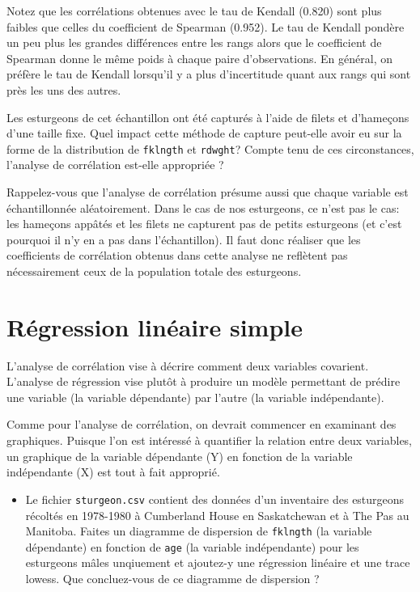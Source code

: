 \documentclass[12pt,]{book}
\providecommand{\tightlist}{%
  \setlength{\itemsep}{0pt}\setlength{\parskip}{0pt}}
\begin{document}
Notez que les corrélations obtenues avec le tau de Kendall (0.820) sont plus faibles que celles du coefficient de Spearman (0.952).
Le tau de Kendall pondère un peu plus les grandes différences entre les rangs alors que le coefficient de Spearman donne le même poids à chaque paire d'observations.
En général, on préfère le tau de Kendall lorsqu'il y a plus d'incertitude quant aux rangs qui sont près les uns des autres.

Les esturgeons de cet échantillon ont été capturés à l'aide de filets et d'hameçons d'une taille fixe.
Quel impact cette méthode de capture peut-elle avoir eu sur la forme de la distribution de \texttt{fklngth} et \texttt{rdwght}?
Compte tenu de ces circonstances, l'analyse de corrélation est-elle appropriée ?

Rappelez-vous que l'analyse de corrélation présume aussi que chaque variable est échantillonnée aléatoirement.
Dans le cas de nos esturgeons, ce n'est pas le cas: les hameçons appâtés et les filets ne capturent pas de petits esturgeons (et c'est pourquoi il n'y en a pas dans l'échantillon).
Il faut donc réaliser que les coefficients de corrélation obtenus dans cette analyse ne reflètent pas nécessairement ceux de la population totale des esturgeons.

\hypertarget{ruxe9gression-linuxe9aire-simple}{%
\section{Régression linéaire simple}\label{ruxe9gression-linuxe9aire-simple}}

L'analyse de corrélation vise à décrire comment deux variables covarient.
L'analyse de régression vise plutôt à produire un modèle permettant de prédire une variable (la variable dépendante) par l'autre (la variable indépendante).

Comme pour l'analyse de corrélation, on devrait commencer en examinant des graphiques.
Puisque l'on est intéressé à quantifier la relation entre deux variables, un graphique de la variable dépendante (Y) en fonction de la variable indépendante (X) est tout à fait approprié.

\begin{itemize}
\tightlist
\item
  Le fichier \texttt{sturgeon.csv} contient des données d'un inventaire des esturgeons récoltés en 1978-1980 à Cumberland House en Saskatchewan et à The Pas au Manitoba.
  Faites un diagramme de dispersion de \texttt{fklngth} (la variable dépendante) en fonction de \texttt{age} (la variable indépendante) pour les esturgeons mâles unqiuement et ajoutez-y une régression linéaire et une trace lowess.
  Que concluez-vous de ce diagramme de dispersion ?
\end{itemize}
\end{document}
